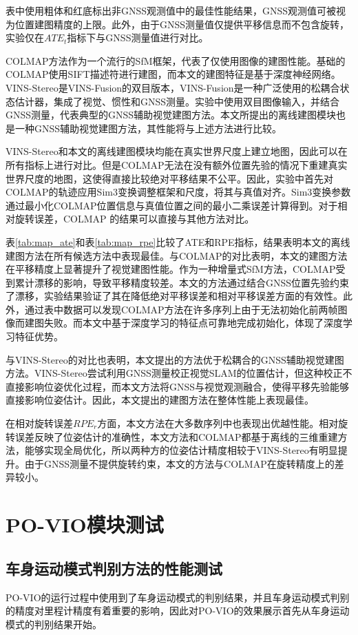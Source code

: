 表中使用粗体和红底标出非GNSS观测值中的最佳性能结果，GNSS观测值可被视为位置建图精度的上限。此外，由于GNSS测量值仅提供平移信息而不包含旋转，实验仅在$ATE_t$指标下与GNSS测量值进行对比。

COLMAP方法作为一个流行的SfM框架，代表了仅使用图像的建图性能。基础的COLMAP使用SIFT\cite{lowe2004distinctive}描述符进行建图，而本文的建图特征是基于深度神经网络。VINS-Stereo是VINS-Fusion的双目版本，VINS-Fusion是一种广泛使用的松耦合状态估计器，集成了视觉、惯性和GNSS测量。实验中使用双目图像输入，并结合GNSS测量，代表典型的GNSS辅助视觉建图方法。本文所提出的离线建图模块也是一种GNSS辅助视觉建图方法，其性能将与上述方法进行比较。

VINS-Stereo和本文的离线建图模块均能在真实世界尺度上建立地图，因此可以在所有指标上进行对比。但是COLMAP无法在没有额外位置先验的情况下重建真实世界尺度的地图，这使得直接比较绝对平移结果不公平。因此，实验中首先对COLMAP的轨迹应用Sim3变换调整框架和尺度，将其与真值对齐。Sim3变换参数通过最小化COLMAP位置信息与真值位置之间的最小二乘误差计算得到。对于相对旋转误差，COLMAP 的结果可以直接与其他方法对比。

表\ref{tab:map_ate}和表\ref{tab:map_rpe}比较了ATE和RPE指标，结果表明本文的离线建图方法在所有候选方法中表现最佳。与COLMAP的对比表明，本文的建图方法在平移精度上显著提升了视觉建图性能。作为一种增量式SfM方法，COLMAP受到累计漂移的影响，导致平移精度较差。本文的方法通过结合GNSS位置先验约束了漂移，实验结果验证了其在降低绝对平移误差和相对平移误差方面的有效性。此外，通过表中数据可以发现COLMAP方法在许多序列上由于无法初始化前两帧图像而建图失败。而本文中基于深度学习的特征点可靠地完成初始化，体现了深度学习特征优势。

与VINS-Stereo的对比也表明，本文提出的方法优于松耦合的GNSS辅助视觉建图方法。VINS-Stereo尝试利用GNSS测量校正视觉SLAM的位置估计，但这种校正不直接影响位姿优化过程，而本文方法将GNSS与视觉观测融合，使得平移先验能够直接影响位姿估计。因此，本文提出的建图方法在整体性能上表现最佳。

在相对旋转误差$RPE_r$方面，本文方法在大多数序列中也表现出优越性能。相对旋转误差反映了位姿估计的准确性，本文方法和COLMAP都基于离线的三维重建方法，能够实现全局优化，所以两种方的位姿估计精度相较于VINS-Stereo有明显提升。由于GNSS测量不提供旋转约束，本文的方法与COLMAP在旋转精度上的差异较小。

\section{PO-VIO模块测试}

\subsection{车身运动模式判别方法的性能测试}
PO-VIO的运行过程中使用到了车身运动模式的判别结果，并且车身运动模式判别的精度对里程计精度有着重要的影响，因此对PO-VIO的效果展示首先从车身运动模式的判别结果开始。

